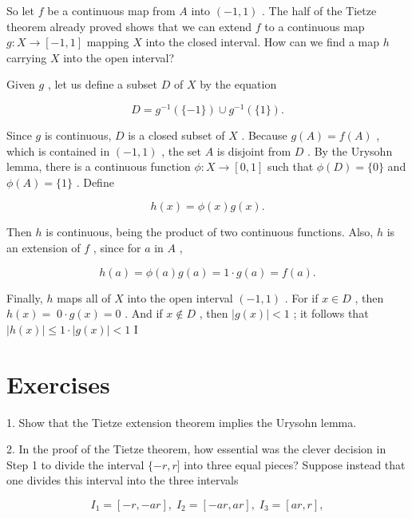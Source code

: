 \documentclass[10pt]{article}
\begin{document}
So let \(f\) be a continuous map from \(A\) into \(\left( {-1,1}\right)\) . The half of the Tietze theorem already proved shows that we can extend \(f\) to a continuous map \(g : X \rightarrow  \left\lbrack  {-1,1}\right\rbrack\) mapping \(X\) into the closed interval. How can we find a map \(h\) carrying \(X\) into the open interval?

Given \(g\) , let us define a subset \(D\) of \(X\) by the equation

\[
D = {g}^{-1}\left( {\{  - 1\} }\right)  \cup  {g}^{-1}\left( {\{ 1\} }\right) .
\]

Since \(g\) is continuous, \(D\) is a closed subset of \(X\) . Because \(g\left( A\right)  = f\left( A\right)\) , which is contained in \(\left( {-1,1}\right)\) , the set \(A\) is disjoint from \(D\) . By the Urysohn lemma, there is a continuous function \(\phi  : X \rightarrow  \left\lbrack  {0,1}\right\rbrack\) such that \(\phi \left( D\right)  = \{ 0\}\) and \(\phi \left( A\right)  = \{ 1\}\) . Define

\[
h\left( x\right)  = \phi \left( x\right) g\left( x\right) .
\]

Then \(h\) is continuous, being the product of two continuous functions. Also, \(h\) is an extension of \(f\) , since for \(a\) in \(A\) ,

\[
h\left( a\right)  = \phi \left( a\right) g\left( a\right)  = 1 \cdot  g\left( a\right)  = f\left( a\right) .
\]

Finally, \(h\) maps all of \(X\) into the open interval \(\left( {-1,1}\right)\) . For if \(x \in  D\) , then \(h\left( x\right)  = \; 0 \cdot  g\left( x\right)  = 0\) . And if \(x \notin  D\) , then \(\left| {g\left( x\right) }\right|  < 1\) ; it follows that \(\left| {h\left( x\right) }\right|  \leq  1 \cdot  \left| {g\left( x\right) }\right|  < 1\) I

\section*{Exercises}

1. Show that the Tietze extension theorem implies the Urysohn lemma.

2. In the proof of the Tietze theorem, how essential was the clever decision in Step 1 to divide the interval \(\{  - r,r\rbrack\) into three equal pieces? Suppose instead that one divides this interval into the three intervals

\[
{I}_{1} = \left\lbrack  {-r, - {ar}}\right\rbrack  ,\;{I}_{2} = \left\lbrack  {-{ar},{ar}}\right\rbrack  ,\;{I}_{3} = \left\lbrack  {{ar},r}\right\rbrack  ,
\]
\end{document}
